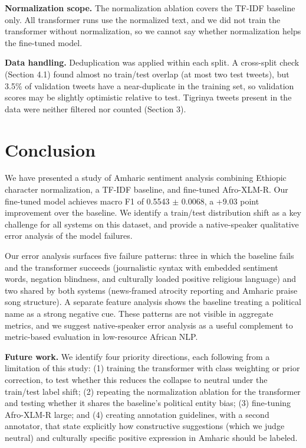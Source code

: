 \textbf{Normalization scope.} The normalization ablation covers the TF-IDF baseline only. All transformer runs use the normalized text, and we did not train the transformer without normalization, so we cannot say whether normalization helps the fine-tuned model.

\textbf{Data handling.} Deduplication was applied within each split. A cross-split check (Section 4.1) found almost no train/test overlap (at most two test tweets), but 3.5\% of validation tweets have a near-duplicate in the training set, so validation scores may be slightly optimistic relative to test. Tigrinya tweets present in the data were neither filtered nor counted (Section 3).


\section{Conclusion}

We have presented a study of Amharic sentiment analysis combining Ethiopic character normalization, a TF-IDF baseline, and fine-tuned Afro-XLM-R. Our fine-tuned model achieves macro F1 of 0.5543 $\pm$ 0.0068, a +9.03 point improvement over the baseline. We identify a train/test distribution shift as a key challenge for all systems on this dataset, and provide a native-speaker qualitative error analysis of the model failures.

Our error analysis surfaces five failure patterns: three in which the baseline fails and the transformer succeeds (journalistic syntax with embedded sentiment words, negation blindness, and culturally loaded positive religious language) and two shared by both systems (news-framed atrocity reporting and Amharic praise song structure). A separate feature analysis shows the baseline treating a political name as a strong negative cue. These patterns are not visible in aggregate metrics, and we suggest native-speaker error analysis as a useful complement to metric-based evaluation in low-resource African NLP.

\textbf{Future work.} We identify four priority directions, each following from a limitation of this study: (1) training the transformer with class weighting or prior correction, to test whether this reduces the collapse to neutral under the train/test label shift; (2) repeating the normalization ablation for the transformer and testing whether it shares the baseline's political entity bias; (3) fine-tuning Afro-XLM-R large; and (4) creating annotation guidelines, with a second annotator, that state explicitly how constructive suggestions (which we judge neutral) and culturally specific positive expression in Amharic should be labeled.

